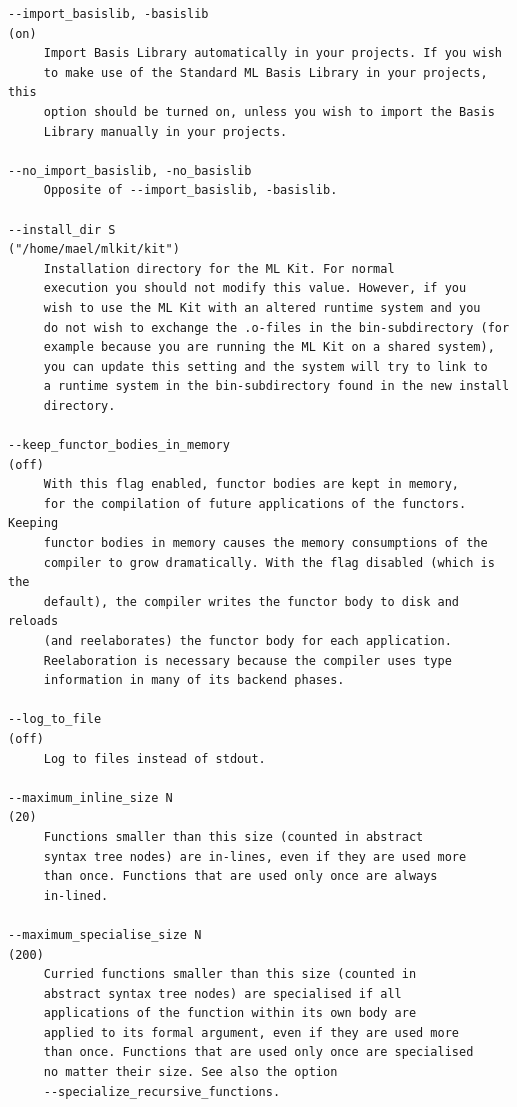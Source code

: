\documentclass[12pt]{book}
\begin{document}
{\begin{verbatim}
--import_basislib, -basislib                                         (on)
     Import Basis Library automatically in your projects. If you wish
     to make use of the Standard ML Basis Library in your projects, this
     option should be turned on, unless you wish to import the Basis
     Library manually in your projects.

--no_import_basislib, -no_basislib
     Opposite of --import_basislib, -basislib.

--install_dir S                                  ("/home/mael/mlkit/kit")
     Installation directory for the ML Kit. For normal
     execution you should not modify this value. However, if you
     wish to use the ML Kit with an altered runtime system and you
     do not wish to exchange the .o-files in the bin-subdirectory (for
     example because you are running the ML Kit on a shared system),
     you can update this setting and the system will try to link to
     a runtime system in the bin-subdirectory found in the new install
     directory.

--keep_functor_bodies_in_memory                                     (off)
     With this flag enabled, functor bodies are kept in memory,
     for the compilation of future applications of the functors. Keeping
     functor bodies in memory causes the memory consumptions of the
     compiler to grow dramatically. With the flag disabled (which is the
     default), the compiler writes the functor body to disk and reloads
     (and reelaborates) the functor body for each application.
     Reelaboration is necessary because the compiler uses type
     information in many of its backend phases.

--log_to_file                                                       (off)
     Log to files instead of stdout.

--maximum_inline_size N                                              (20)
     Functions smaller than this size (counted in abstract
     syntax tree nodes) are in-lines, even if they are used more
     than once. Functions that are used only once are always
     in-lined.

--maximum_specialise_size N                                         (200)
     Curried functions smaller than this size (counted in
     abstract syntax tree nodes) are specialised if all
     applications of the function within its own body are
     applied to its formal argument, even if they are used more
     than once. Functions that are used only once are specialised
     no matter their size. See also the option
     --specialize_recursive_functions.


\end{verbatim}}
\end{document}
